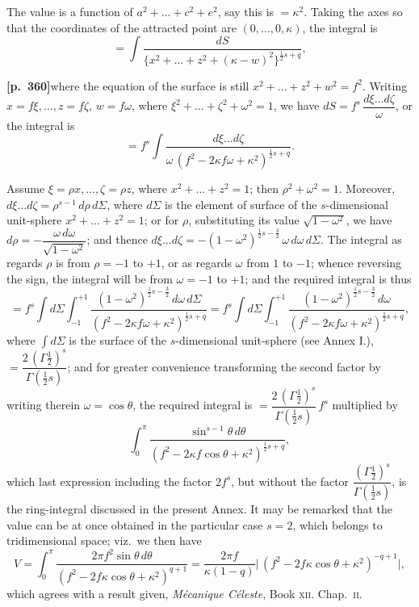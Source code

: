 \documentclass[11pt]{article}
\begin{document}
The value is a function of $a^{2}+\ldots+c^{2}+e^{2}$, say this is $=\kappa^{2}$. Taking the axes so that the coordinates of the attracted point are $(0,\ldots,0,\kappa)$, the integral is
\[
= \int\frac{dS}{\{x^{2}+\ldots+z^{2}+(\kappa-w)^{2}\}^{\frac{1}{2}s+q}},
\]

\bigskip

\noindent\textbf{[p.~360]}\quad where the equation of the surface is still $x^{2}+\ldots+z^{2}+w^{2}=f^{2}$. Writing $x=f\xi,\ldots,z=f\zeta$, $w=f\omega$, where $\xi^{2}+\ldots+\zeta^{2}+\omega^{2}=1$, we have $dS=f^{s}\,\dfrac{d\xi\ldots d\zeta}{\omega}$, or the integral is
\[
= f^{s}\int\frac{d\xi\ldots d\zeta}{\omega\,(f^{2}-2\kappa f\omega+\kappa^{2})^{\frac{1}{2}s+q}}.
\]

Assume $\xi=\rho x,\ldots,\zeta=\rho z$, where $x^{2}+\ldots+z^{2}=1$; then $\rho^{2}+\omega^{2}=1$. Moreover, $d\xi\ldots d\zeta = \rho^{s-1}\,d\rho\,d\Sigma$, where $d\Sigma$ is the element of surface of the $s$-dimensional unit-sphere $x^{2}+\ldots+z^{2}=1$; or for $\rho$, substituting its value $\sqrt{1-\omega^{2}}$, we have $d\rho = -\dfrac{\omega\,d\omega}{\sqrt{1-\omega^{2}}}$; and thence $d\xi\ldots d\zeta = -(1-\omega^{2})^{\frac{1}{2}s-\frac{3}{2}}\,\omega\,d\omega\,d\Sigma$. The integral as regards $\rho$ is from $\rho=-1$ to $+1$, or as regards $\omega$ from $1$ to $-1$; whence reversing the sign, the integral will be from $\omega=-1$ to $+1$; and the required integral is thus
\[
= f^{s}\int d\Sigma\int_{-1}^{+1}\frac{(1-\omega^{2})^{\frac{1}{2}s-\frac{3}{2}}\,d\omega\,d\Sigma}{(f^{2}-2\kappa f\omega+\kappa^{2})^{\frac{1}{2}s+q}}
= f^{s}\int d\Sigma\int_{-1}^{+1}\frac{(1-\omega^{2})^{\frac{1}{2}s-\frac{3}{2}}\,d\omega}{(f^{2}-2\kappa f\omega+\kappa^{2})^{\frac{1}{2}s+q}},
\]
where $\displaystyle\int d\Sigma$ is the surface of the $s$-dimensional unit-sphere (see Annex I.), $=\dfrac{2\,(\Gamma\tfrac{1}{2})^{s}}{\Gamma(\tfrac{1}{2}s)}$; and for greater convenience transforming the second factor by writing therein $\omega=\cos\theta$, the required integral is $=\dfrac{2\,(\Gamma\tfrac{1}{2})^{s}}{\Gamma(\tfrac{1}{2}s)}\,f^{s}$ multiplied by
\[
\int_{0}^{\pi}\frac{\sin^{s-1}\theta\,d\theta}{(f^{2}-2\kappa f\cos\theta+\kappa^{2})^{\frac{1}{2}s+q}},
\]
which last expression including the factor $2f^{s}$, but without the factor $\dfrac{(\Gamma\tfrac{1}{2})^{s}}{\Gamma(\tfrac{1}{2}s)}$, is the ring-integral discussed in the present Annex. It may be remarked that the value can be at once obtained in the particular case $s=2$, which belongs to tridimensional space; viz.\ we then have
\[
V = \int_{0}^{\pi}\frac{2\pi f^{2}\sin\theta\,d\theta}{(f^{2}-2f\kappa\cos\theta+\kappa^{2})^{q+1}}
= \frac{2\pi f}{\kappa(1-q)}\bigl|\,(f^{2}-2f\kappa\cos\theta+\kappa^{2})^{-q+1}\bigr|,
\]
which agrees with a result given, \textit{M\'ecanique C\'eleste}, Book \textsc{xii.} Chap.\ \textsc{ii.}
\end{document}
